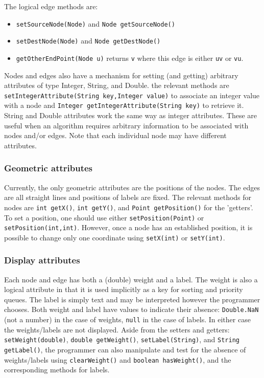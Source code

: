 The logical edge methods are:

\begin{itemize}
\item
\texttt{setSourceNode(Node)} and \texttt{Node~getSourceNode()}
\item
\texttt{setDestNode(Node)} and \texttt{Node~getDestNode()}
\item
\texttt{getOtherEndPoint(Node~u)} returns \texttt{v} where this edge is
either \texttt{uv} or \texttt{vu}.
\end{itemize}

Nodes and edges also have a mechanism for setting (and getting)
arbitrary attributes of type Integer, String, and Double.
the relevant methods are
\texttt{setIntegerAttribute(String~key,Integer~value)} 
to associate an integer value with a node and
\texttt{Integer~getIntegerAttribute(String~key)} to retrieve it.
String and Double attributes work the same way as integer attributes.
These are useful when an algorithm requires arbitrary information to be
associated with nodes and/or edges.
Note that each individual node may have different attributes.

\subsubsection*{Geometric attributes}

Currently, the only geometric attributes are the positions of the
nodes. The edges are all straight lines and positions of labels are fixed.
The relevant methods for nodes are
\texttt{int~getX()}, \texttt{int~getY()}, and \texttt{Point~getPosition()}
for the 'getters'. To set a position,
one should use either \texttt{setPosition(Point)} or \texttt{setPosition(int,int)}.
However, once a node has an established position, it is possible to change
only one coordinate using \texttt{setX(int)} or \texttt{setY(int)}.

\subsubsection*{Display attributes}

Each node and edge has
both a (double) weight and a label.
The weight
is also a logical
attribute in that
it is used implicitly as a
key for
sorting and priority queues.
The label is simply text and may be interpreted however the programmer
chooses.
Both weight and label have values to indicate their absence:
\texttt{Double.NaN} (not a number) in the case of weights, \texttt{null}
in the case of labels.
In either case the weights/labels are not displayed.
Aside from the setters and getters: \texttt{setWeight(double)},
\mbox{\texttt{double getWeight()}}, \texttt{setLabel(String)},
and \mbox{\texttt{String getLabel()}}, the programmer can also
manipulate and test for the absence of weights/labels using
\texttt{clearWeight()} and \texttt{boolean~hasWeight()},
and the corresponding methods for labels.

